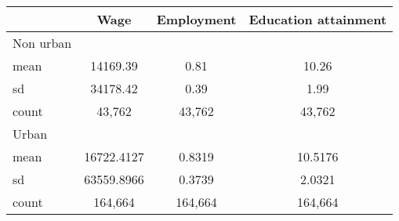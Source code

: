 {
\def\sym#1{\ifmmode^{#1}\else\(^{#1}\)\fi}
\begin{tabular*}{\textwidth}{@{\hskip\tabcolsep\extracolsep\fill}l*{1}{ccc}}
\toprule
            &        Wage&  Employment&Education attainment\\
\midrule
Non urban   &            &            &            \\
mean        &    14169.39&        0.81&       10.26\\
sd          &    34178.42&        0.39&        1.99\\
count       &      43,762&      43,762&      43,762\\
\midrule
Urban       &            &            &            \\
mean        &  16722.4127&      0.8319&     10.5176\\
sd          &  63559.8966&      0.3739&      2.0321\\
count       &     164,664&     164,664&     164,664\\
\bottomrule
\end{tabular*}
}
